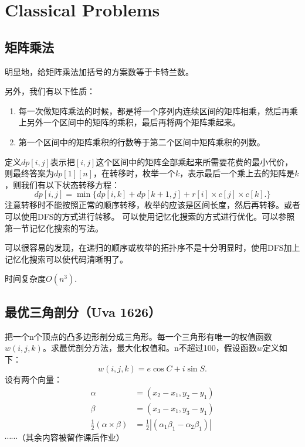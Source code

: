 \documentclass{article}
\begin{document}
\section{Classical Problems}
\subsection{矩阵乘法}
明显地，给矩阵乘法加括号的方案数等于卡特兰数。

另外，我们有以下性质：
\begin{enumerate}
    \item{每一次做矩阵乘法的时候，都是将一个序列内连续区间的矩阵相乘，然后再乘上另外一个区间中的矩阵的乘积，最后再将两个矩阵乘起来。}
    \item{第一个区间中的矩阵乘积的行数等于第二个区间中矩阵乘积的列数。}
\end{enumerate}

定义$dp[i,j]$表示把$[i,j]$这个区间中的矩阵全部乘起来所需要花费的最小代价，则最终答案为$dp[1][n]$，在转移时，枚举一个$k$，表示最后一个乘上去的矩阵是$k$，则我们有以下状态转移方程：
\begin{equation*}
    dp[i,j]=\min\{dp[i,k]+dp[k+1,j]+r[i]\times c[j]\times c[k].\}
\end{equation*}
注意转移时不能按照正常的顺序转移，枚举的应该是区间长度，然后再转移。或者可以使用DFS的方式进行转移。
可以使用记忆化搜索的方式进行优化。可以参照第一节记忆化搜索的写法。

可以很容易的发现，在递归的顺序或枚举的拓扑序不是十分明显时，使用DFS加上记忆化搜索可以使代码清晰明了。

时间复杂度$O(n^3)$.
\subsection{最优三角剖分（Uva 1626）}

把一个n个顶点的凸多边形剖分成三角形。每一个三角形有唯一的权值函数$w(i,j,k)$。求最优剖分方法，最大化权值和。n不超过100，假设函数$w$定义如下：
\begin{equation*}
    w(i,j,k)=e\cos C+i\sin S.
\end{equation*}
设有两个向量：
\begin{equation*}
    \begin{aligned}
        \alpha&=(x_2-x_1,y_2-y_1)\\
        \beta&=(x_3-x_1,y_3-y_1)\\
        \frac{1}{2}(\alpha\times\beta)&=\frac{1}{2}|(\alpha_1\beta_1-\alpha_2\beta_1)|
    \end{aligned}
\end{equation*}
$\cdots\cdots（其余内容被留作课后作业）$
\end{document}
